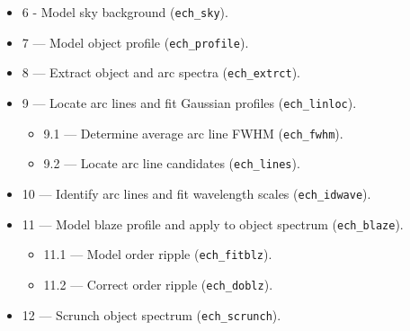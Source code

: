 \documentclass[11pt,twoside]{article}
\newcommand{\htmlref}[2]{#1}
\newcommand{\sunspec}[2]{#1}
\renewcommand{\sunspec}[2]{#2}
\newcommand{\myindex}[1]{\index{#1}}
\renewcommand{\myindex}[1]{}
\begin{document}
\begin{itemize}
\myindex{Sky!model}
\item {6 \sunspec{---}{-} Model sky background
      (\htmlref{{\tt{ech\_sky}}}{ech_sky}).}

\myindex{Object!profile}
\myindex{Profile!object}
\item {7 --- Model object profile
      (\htmlref{{\tt{ech\_profile}}}{ech_profile}).}

\myindex{Extraction}
\item {8 --- Extract object and arc spectra
      (\htmlref{{\tt{ech\_extrct}}}{ech_extrct}).}

\myindex{Arc line!location}
\myindex{Arc line!FWHM}
\item {9 --- Locate arc lines and fit Gaussian profiles
      (\htmlref{{\tt{ech\_linloc}}}{ech_linloc}).}

\begin{itemize}

   \item {9.1 --- Determine average arc line FWHM
         (\htmlref{{\tt{ech\_fwhm}}}{ech_fwhm}).}

   \item {9.2 --- Locate arc line candidates
         (\htmlref{{\tt{ech\_lines}}}{ech_lines}).}

\end{itemize}

\myindex{Wavelength calibration}
\myindex{Arc line!calibration}
\item {10 --- Identify arc lines and fit wavelength scales
      (\htmlref{{\tt{ech\_idwave}}}{ech_idwave}).}

\item {11 --- Model blaze profile and apply to object spectrum
      (\htmlref{{\tt{ech\_blaze}}}{ech_blaze}).}

\myindex{Order!ripple}
\begin {itemize}

   \item {11.1 --- Model order ripple
         (\htmlref{{\tt{ech\_fitblz}}}{ech_fitblz}).}

   \item {11.2 --- Correct order ripple
         (\htmlref{{\tt{ech\_doblz}}}{ech_doblz}).}

\end{itemize}

\item {12 --- Scrunch object spectrum
      (\htmlref{{\tt{ech\_scrunch}}}{ech_scrunch}).}

\begin{itemize}


\end{itemize}
\end{itemize}
\end{document}
